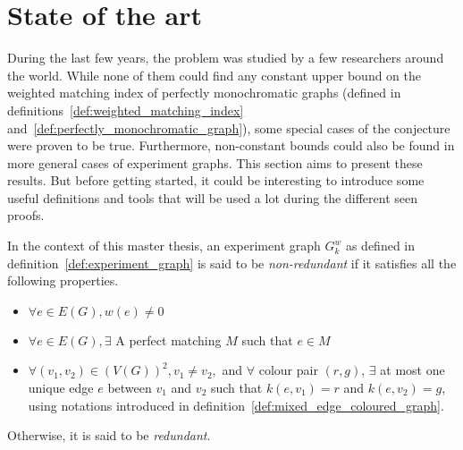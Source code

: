 \chapter{State of the art}
\label{ch:state-of-the-art}

During the last few years, the problem was studied by a few researchers around the world.\cite{Krenn_2017,bogdanov,chandran,chandran2023graphtheoretic}
While none of them could find any constant upper bound on the weighted matching index of perfectly monochromatic graphs (defined in definitions~\ref{def:weighted_matching_index} and~\ref{def:perfectly_monochromatic_graph}), some special cases of the conjecture were proven to be true.
Furthermore, non-constant bounds could also be found in more general cases of experiment graphs.
This section aims to present these results.
But before getting started, it could be interesting to introduce some useful definitions and tools that will be used a lot during the different seen proofs.

\begin{definition}
    \label{def:redundant-experiment-graph}
    In the context of this master thesis, an experiment graph $G_k^w$ as defined in definition~\ref{def:experiment_graph} is said to be \textit{non-redundant} if it satisfies all the following properties.

    \begin{itemize}
        \item $\forall e \in E(G), w(e) \neq 0$
        \item $\forall e \in E(G), \exists$ A perfect matching $M$ such that $e \in M$
        \item $\forall (v_1, v_2) \in (V(G))^2, v_1 \neq v_2,$ and $\forall$ colour pair $(r, g)$, $\exists$ at most one unique edge $e$ between $v_1$ and $v_2$ such that $k(e, v_1) = r$ and $k(e, v_2) = g$, using notations introduced in definition~\ref{def:mixed_edge_coloured_graph}.
    \end{itemize}

    Otherwise, it is said to be \textit{redundant}.
\end{definition}


